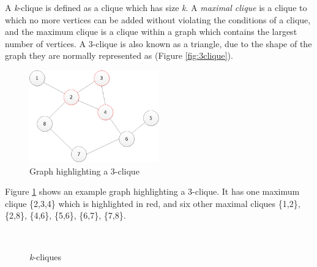 A \emph{k}-clique is defined as a clique which has size \emph{k}. A \emph{maximal clique} is a clique to which no more vertices can be added without violating the conditions of a clique, and the maximum clique is a clique within a graph which contains the largest number of vertices. A 3-clique is also known as a triangle, due to the shape of the graph they are normally represented as (Figure \ref{fig:3clique}).

\begin{figure}[htbp]
\centering
\includegraphics[width=0.5\textwidth]{./img/clique.png}
\caption{Graph highlighting a 3-clique}
\label{fig:clique}
\end{figure}

Figure \ref{fig:clique} shows an example graph highlighting a 3-clique. It has one maximum clique \{2,3,4\} which is highlighted in red, and six other maximal cliques \{1,2\}, \{2,8\}, \{4,6\}, \{5,6\}, \{6,7\}, \{7,8\}.

\begin{figure}
  \centering
   ~  ~ 
  \caption{\emph{k}-cliques}
  \label{fig:cliques}
\end{figure}

